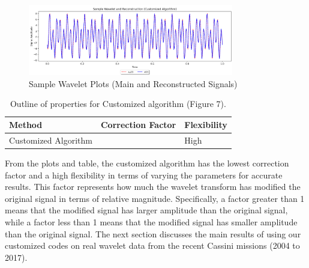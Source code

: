 \documentclass{article}
\begin{document}
\begin{figure}[h]
\centering 
\includegraphics[width=0.8\textwidth]{Python_Wavelet_Transform_Plot_Combined.png} 
\caption{Sample Wavelet Plots (Main and Reconstructed Signals)} \label{fig:my_label}
\end{figure}



\begin{table}[h]
\centering
\begin{tabularx}{0.8\textwidth} { 
  | >{\raggedright\arraybackslash}X 
  | >{\centering\arraybackslash}X 
  | >{\raggedleft\arraybackslash}X | }
 \hline
 Method & Correction Factor & Flexibility \\
 \hline
 Customized Algorithm  & 1.0130  & High  \\
\hline
\end{tabularx}
\caption{Outline of properties for Customized algorithm (Figure 7).}
\label{table:comparison}
\end{table}

From the plots and table, the customized algorithm has the lowest correction factor and a high flexibility in terms of varying the parameters for accurate results. This factor represents how much the wavelet transform has modified the original signal in terms of relative magnitude. Specifically, a factor greater than 1 means that the modified signal has larger amplitude than the original signal, while a factor less than 1 means that the modified signal has smaller amplitude than the original signal. The next section discusses the main results of using our customized codes on real wavelet data from the recent Cassini missions (2004 to 2017).  
\end{document}
